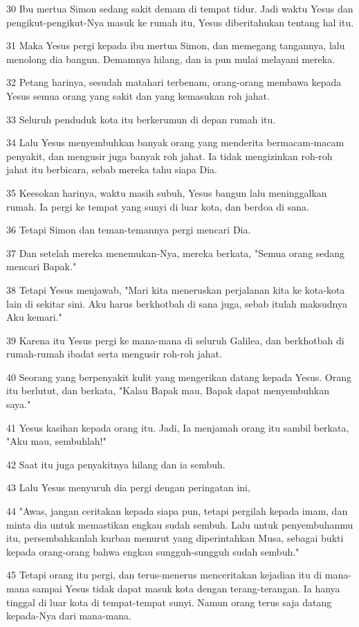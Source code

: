 \par 30 Ibu mertua Simon sedang sakit demam di tempat tidur. Jadi waktu Yesus dan pengikut-pengikut-Nya masuk ke rumah itu, Yesus diberitahukan tentang hal itu.
\par 31 Maka Yesus pergi kepada ibu mertua Simon, dan memegang tangannya, lalu menolong dia bangun. Demamnya hilang, dan ia pun mulai melayani mereka.
\par 32 Petang harinya, sesudah matahari terbenam, orang-orang membawa kepada Yesus semua orang yang sakit dan yang kemasukan roh jahat.
\par 33 Seluruh penduduk kota itu berkerumun di depan rumah itu.
\par 34 Lalu Yesus menyembuhkan banyak orang yang menderita bermacam-macam penyakit, dan mengusir juga banyak roh jahat. Ia tidak mengizinkan roh-roh jahat itu berbicara, sebab mereka tahu siapa Dia.
\par 35 Keesokan harinya, waktu masih subuh, Yesus bangun lalu meninggalkan rumah. Ia pergi ke tempat yang sunyi di luar kota, dan berdoa di sana.
\par 36 Tetapi Simon dan teman-temannya pergi mencari Dia.
\par 37 Dan setelah mereka menemukan-Nya, mereka berkata, "Semua orang sedang mencari Bapak."
\par 38 Tetapi Yesus menjawab, "Mari kita meneruskan perjalanan kita ke kota-kota lain di sekitar sini. Aku harus berkhotbah di sana juga, sebab itulah maksudnya Aku kemari."
\par 39 Karena itu Yesus pergi ke mana-mana di seluruh Galilea, dan berkhotbah di rumah-rumah ibadat serta mengusir roh-roh jahat.
\par 40 Seorang yang berpenyakit kulit yang mengerikan datang kepada Yesus. Orang itu berlutut, dan berkata, "Kalau Bapak mau, Bapak dapat menyembuhkan saya."
\par 41 Yesus kasihan kepada orang itu. Jadi, Ia menjamah orang itu sambil berkata, "Aku mau, sembuhlah!"
\par 42 Saat itu juga penyakitnya hilang dan ia sembuh.
\par 43 Lalu Yesus menyuruh dia pergi dengan peringatan ini,
\par 44 "Awas, jangan ceritakan kepada siapa pun, tetapi pergilah kepada imam, dan minta dia untuk memastikan engkau sudah sembuh. Lalu untuk penyembuhanmu itu, persembahkanlah kurban menurut yang diperintahkan Musa, sebagai bukti kepada orang-orang bahwa engkau sungguh-sungguh sudah sembuh."
\par 45 Tetapi orang itu pergi, dan terus-menerus menceritakan kejadian itu di mana-mana sampai Yesus tidak dapat masuk kota dengan terang-terangan. Ia hanya tinggal di luar kota di tempat-tempat sunyi. Namun orang terus saja datang kepada-Nya dari mana-mana.


